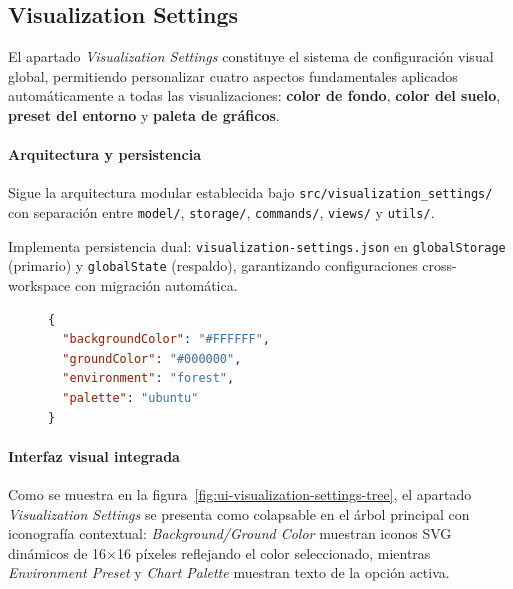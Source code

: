 \documentclass[a4paper, 12pt]{book}
\begin{document}

\subsection{Visualization Settings}
\label{sec:visualization-settings}

El apartado \emph{Visualization Settings} constituye el sistema de configuración visual global, permitiendo personalizar cuatro aspectos fundamentales aplicados automáticamente a todas las visualizaciones: \textbf{color de fondo}, \textbf{color del suelo}, \textbf{preset del entorno} y \textbf{paleta de gráficos}.

\paragraph{Arquitectura y persistencia}
Sigue la arquitectura modular establecida bajo \texttt{src/visualization\_settings/} con separación entre \texttt{model/}, \texttt{storage/}, \texttt{commands/}, \texttt{views/} y \texttt{utils/}. 

Implementa persistencia dual: \texttt{visualization-settings.json} en \texttt{globalStorage} (primario) y \texttt{globalState} (respaldo), garantizando configuraciones cross-workspace con migración automática.

\begin{figure}[H]
\centering
\begin{minipage}{0.9\linewidth}
\begin{lstlisting}[language=json,
caption={Estructura del archivo \texttt{visualization-settings.json} que persiste las preferencias visuales globales.},
label={fig:visualization-settings-json}]
{
  "backgroundColor": "#FFFFFF",
  "groundColor": "#000000",
  "environment": "forest", 
  "palette": "ubuntu"
}
\end{lstlisting}
\end{minipage}
\end{figure}

\paragraph{Interfaz visual integrada}
Como se muestra en la figura~\ref{fig:ui-visualization-settings-tree}, el apartado \emph{Visualization Settings} se presenta como colapsable en el árbol principal con iconografía contextual: \emph{Background/Ground Color} muestran iconos SVG dinámicos de 16×16 píxeles reflejando el color seleccionado, mientras \emph{Environment Preset} y \emph{Chart Palette} muestran texto de la opción activa.
\end{document}
